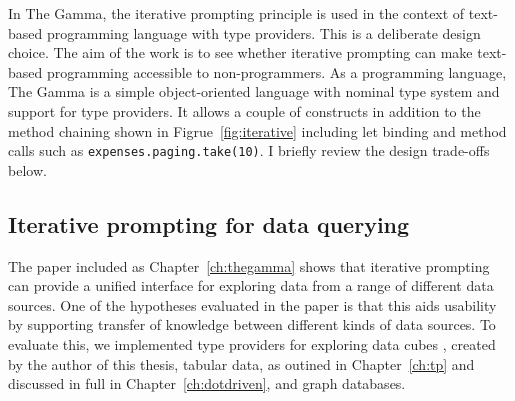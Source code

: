 \documentclass[fleqn,11pt]{report}
\theoremstyle{definition}
\begin{document}
In The Gamma, the iterative prompting principle is used in the context of text-based
programming language with type providers. This is a deliberate design choice. The aim of the
work is to see whether iterative prompting can make text-based programming accessible to
non-programmers. As a programming language, The Gamma is a simple object-oriented language
with nominal type system and support for type providers. It allows a couple of constructs
in addition to the method chaining shown in Figrue~\ref{fig:iterative} including let binding
and method calls such as \texttt{expenses.paging.take(10)}. I briefly review the design trade-offs
below.

\subsection{Iterative prompting for data querying}

The paper included as Chapter~\ref{ch:thegamma} shows that iterative prompting can
provide a unified interface for exploring data from a range of different data sources.
One of the hypotheses evaluated in the paper is that this aids usability by supporting transfer
of knowledge between different kinds of data sources. To evaluate this, we implemented
type providers for exploring data cubes \citep{syme-2013-inforich}, created by the author of
this thesis, tabular data, as outined in Chapter~\ref{ch:tp} and discussed in
full in Chapter~\ref{ch:dotdriven}, and graph databases.
\end{document}
